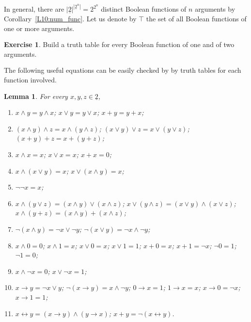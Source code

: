 \documentclass[12pt,notitlepage]{article}
\theoremstyle{plain}
\newtheorem{lemma}[thm]{Lemma}
\theoremstyle{definition}
\newtheorem{exc}[thm]{Exercise}
\theoremstyle{plain}
\newcommand{\ul}[1]{\underline{#1}}
\newcommand{\1}{\mathbf{1}}
\newcommand{\0}{\mathbf{0}}
\begin{document}
In general, there are $|\ul{2}|^{|\ul{2}^n|} = 2^{2^n}$ distinct Boolean functions of $n$ arguments by Corollary~\ref{L10:num_func}. Let us denote by $\top$ the set of all Boolean functions of one or more arguments.

\begin{exc}
Build a truth table for every Boolean function of one and of two arguments.
\end{exc}

\noindent The following useful equations can be easily checked by by truth tables for each function involved.
\begin{lemma}\label{L15:bool_eq1}
For every $x,y,z \in \ul{2}$,
\begin{enumerate}
\item $x \wedge y = y \wedge x$; $x \vee y = y \vee x$; $x + y = y + x$;
\item $(x \wedge y) \wedge z = x \wedge (y \wedge z)$; $(x \vee y) \vee z = x \vee (y \vee z)$; $(x + y) + z = x + (y + z)$;
\item $x \wedge x = x$; $x \vee x = x$; $x + x = 0$;
\item $x \wedge (x \vee y) = x$; $x \vee (x \wedge y) = x$;
\item $\neg\neg x = x$;
\item $x \wedge (y \vee z) = (x \wedge y) \vee (x\wedge z)$; $x \vee (y \wedge z) = (x\vee y) \wedge (x \vee z)$; $x \wedge (y + z) = (x\wedge y) + (x \wedge z)$;
\item $\neg(x\wedge y) = \neg x \vee \neg y$; $\neg(x \vee y) = \neg x \wedge \neg y$;
\item $x \wedge 0 = 0$; $x \wedge 1 = x$; $x\vee 0 = x$; $x \vee 1 = 1$; $x + 0 = x$; $x + 1 = \neg x$; $\neg 0 = 1$; $\neg 1 = 0$;
\item $x \wedge \neg x = 0$; $x \vee \neg x = 1$;
\item $x \to y = \neg x \vee y$; $\neg(x \to y) = x \wedge \neg y$; $0 \to x = 1$; $1 \to x = x$; $x \to 0 = \neg x$; $x \to 1 = 1$;
\item $x \leftrightarrow y = (x \to y) \wedge (y \to x)$; $x + y = \neg (x \leftrightarrow y)$.
\end{enumerate}
\end{lemma}
\end{document}

